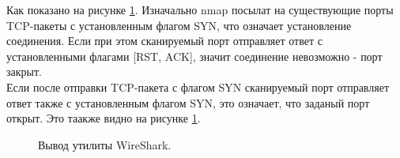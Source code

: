 \documentclass[10pt,a4paper]{report}
\begin{document}
Как показано на рисунке \ref{ris:image1}. Изначально nmap посылат на существующие порты TCP-пакеты с установленным флагом SYN, что означает установление соединения. Если при этом сканируемый порт отправляет ответ с установленными флагами [RST, ACK], значит соединение невозможно - порт закрыт.\\
Если после отправки TCP-пакета с флагом SYN сканируемый порт отправляет ответ также с установленным флагом SYN, это означает, что заданый порт открыт. Это таакже видно на рисунке \ref{ris:image1}.\\
\begin{figure}[ht]	
\caption{Вывод утилиты WireShark.}\label{ris:image1}
\end{figure} \\		
		
\end{document}
